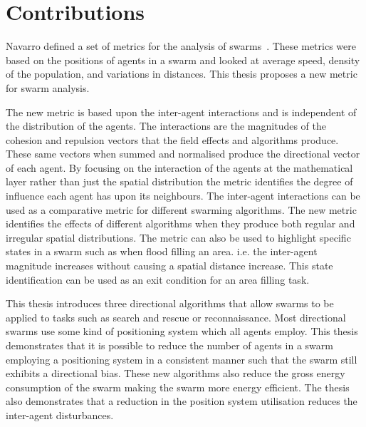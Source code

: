 \section{Contributions}
Navarro defined a set of metrics for the analysis of swarms~\cite{NIM:09}. These metrics were based on the positions of agents in a swarm and looked at average speed, density of the population, and variations in distances. This thesis proposes a new metric for swarm analysis. 

The new metric is based upon the inter-agent interactions and is independent of the distribution of the agents. The interactions are the magnitudes of the cohesion and repulsion vectors that the field effects and algorithms produce. These same vectors when summed and normalised produce the directional vector of each agent. By focusing on the interaction of the agents at the mathematical layer rather than just the spatial distribution the metric identifies the degree of influence each agent has upon its neighbours. The inter-agent interactions can be used as a comparative metric for different swarming algorithms. The new metric identifies the effects of different algorithms when they produce both regular and irregular spatial distributions. The metric can also be used to highlight specific states in a swarm such as when flood filling an area. i.e. the inter-agent magnitude increases without causing a spatial distance increase. This state identification can be used as an exit condition for an area filling task.


This thesis introduces three directional algorithms that allow swarms to be applied to tasks such as search and rescue or reconnaissance. Most directional swarms use some kind of positioning system which all agents employ. This thesis demonstrates that it is possible to reduce the number of agents in a swarm employing a positioning system in a consistent manner such that the swarm still exhibits a directional bias. These new algorithms also reduce the gross energy consumption of the swarm making the swarm more energy efficient. The thesis also demonstrates that a reduction in the position system utilisation reduces the inter-agent disturbances.  

